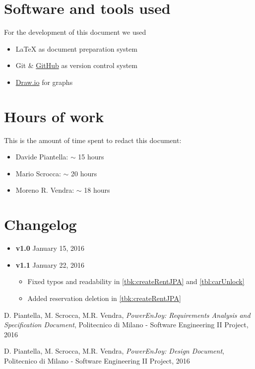 \begin{appendices}

	\section{Software and tools used}
	For the development of this document we used
	\begin{itemize}
		\item \LaTeX{} as document preparation system
		\item Git \& \href{http://github.com}{GitHub} as version control system
		\item \href{http://draw.io}{Draw.io} for graphs 
	\end{itemize}
	
	\section{Hours of work}
	This is the amount of time spent to redact this document:
	\begin{itemize}
		\item Davide Piantella: $\sim$ 15 hours
		\item Mario Scrocca: $\sim$ 20 hours
		\item Moreno R. Vendra: $\sim$ 18 hours
	\end{itemize}
	
	\section{Changelog}
	\begin{itemize}
		\item \textbf{v1.0} January 15, 2016
		\item \textbf{v1.1} January 22, 2016
		\begin{itemize}
			\item Fixed typos and readability in \autoref{tbk:createRentJPA} and \autoref{tbl:carUnlock}
			\item Added reservation deletion in \autoref{tbk:createRentJPA}
		\end{itemize}
	\end{itemize}
	
\end{appendices}


\begin{thebibliography}{9}

D. Piantella, M. Scrocca, M.R. Vendra, \emph{PowerEnJoy: Requirements Analysis and Specification Document}, Politecnico di Milano - Software Engineering II Project, 2016

D. Piantella, M. Scrocca, M.R. Vendra, \emph{PowerEnJoy: Design Document}, Politecnico di Milano - Software Engineering II Project, 2016

\end{thebibliography}